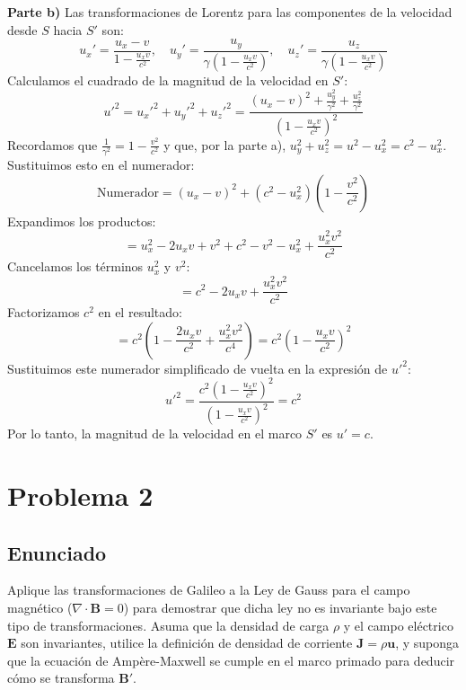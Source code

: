 \documentclass[a4paper,11pt]{article}
\begin{document}
\textbf{Parte b)}
Las transformaciones de Lorentz para las componentes de la velocidad desde $S$ hacia $S'$ son:
$$ u_x' = \frac{u_x - v}{1 - \frac{u_x v}{c^2}}, \quad u_y' = \frac{u_y}{\gamma \left(1 - \frac{u_x v}{c^2}\right)}, \quad u_z' = \frac{u_z}{\gamma \left(1 - \frac{u_x v}{c^2}\right)} $$
Calculamos el cuadrado de la magnitud de la velocidad en $S'$:
$$ u'^2 = u_x'^2 + u_y'^2 + u_z'^2 = \frac{(u_x - v)^2 + \frac{u_y^2}{\gamma^2} + \frac{u_z^2}{\gamma^2}}{\left(1 - \frac{u_x v}{c^2}\right)^2} $$
Recordamos que $\frac{1}{\gamma^2} = 1 - \frac{v^2}{c^2}$ y que, por la parte a), $u_y^2 + u_z^2 = u^2 - u_x^2 = c^2 - u_x^2$. Sustituimos esto en el numerador:
$$ \text{Numerador} = (u_x - v)^2 + (c^2 - u_x^2)\left(1 - \frac{v^2}{c^2}\right) $$
Expandimos los productos:
$$ = u_x^2 - 2u_x v + v^2 + c^2 - v^2 - u_x^2 + \frac{u_x^2 v^2}{c^2} $$
Cancelamos los términos $u_x^2$ y $v^2$:
$$ = c^2 - 2u_x v + \frac{u_x^2 v^2}{c^2} $$
Factorizamos $c^2$ en el resultado:
$$ = c^2 \left(1 - \frac{2u_x v}{c^2} + \frac{u_x^2 v^2}{c^4}\right) = c^2 \left(1 - \frac{u_x v}{c^2}\right)^2 $$
Sustituimos este numerador simplificado de vuelta en la expresión de $u'^2$:
$$ u'^2 = \frac{c^2 \left(1 - \frac{u_x v}{c^2}\right)^2}{\left(1 - \frac{u_x v}{c^2}\right)^2} = c^2 $$
Por lo tanto, la magnitud de la velocidad en el marco $S'$ es $u' = c$.

\section{Problema 2}

\subsection{Enunciado}
Aplique las transformaciones de Galileo a la Ley de Gauss para el campo magnético ($\nabla \cdot \mathbf{B} = 0$) para demostrar que dicha ley no es invariante bajo este tipo de transformaciones. Asuma que la densidad de carga $\rho$ y el campo eléctrico $\mathbf{E}$ son invariantes, utilice la definición de densidad de corriente $\mathbf{J} = \rho \mathbf{u}$, y suponga que la ecuación de Ampère-Maxwell se cumple en el marco primado para deducir cómo se transforma $\mathbf{B}'$.
\end{document}
